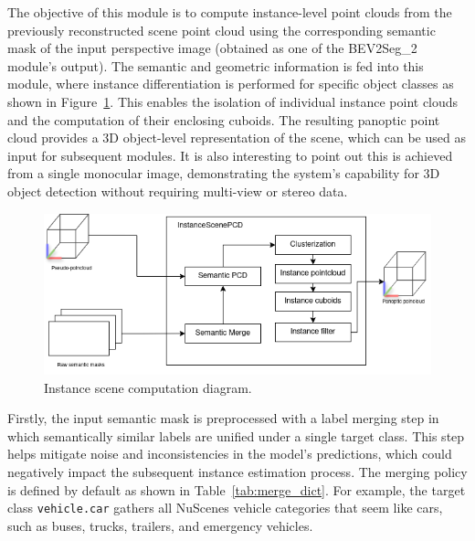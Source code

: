 The objective of this module is to compute instance-level point clouds from the previously reconstructed scene point cloud using the corresponding semantic mask of the input perspective image (obtained as one of the BEV2Seg\_2 module's output). The semantic and geometric information is fed into this module, where instance differentiation is performed for specific object classes as shown in Figure~\ref{fig:instance_scene_diagram}. This enables the isolation of individual instance point clouds and the computation of their enclosing cuboids. The resulting panoptic point cloud provides a 3D object-level representation of the scene, which can be used as input for subsequent modules. It is also interesting to point out this is achieved from a single monocular image, demonstrating the system's capability for 3D object detection without requiring multi-view or stereo data.

\begin{figure}[h!]
    \centering
    \includegraphics[width=0.6\linewidth]{images/methodology/instance_scene_flow_diagram.png}
    \caption{Instance scene computation diagram.}
    \label{fig:instance_scene_diagram}
\end{figure}

Firstly, the input semantic mask is preprocessed with a label merging step in which semantically similar labels are unified under a single target class. This step helps mitigate noise and inconsistencies in the model's predictions, which could negatively impact the subsequent instance estimation process. The merging policy is defined by default as shown in Table~\ref{tab:merge_dict}. For example, the target class \texttt{vehicle.car} gathers all NuScenes vehicle categories that seem like cars, such as buses, trucks, trailers, and emergency vehicles.

